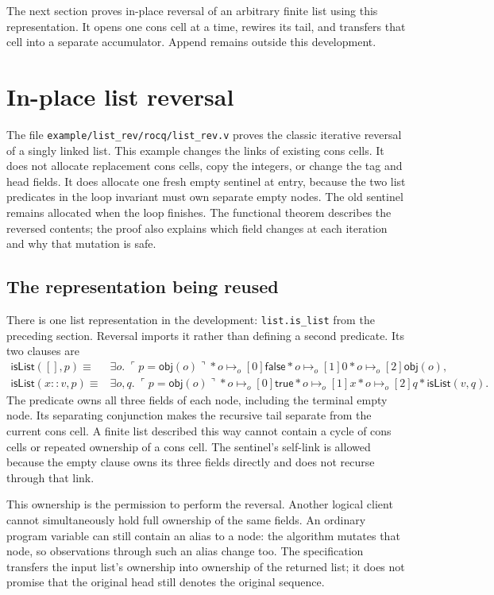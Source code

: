 \documentclass[11pt]{article}
\newcommand{\True}{\mathsf{true}}
\newcommand{\False}{\mathsf{false}}
\newcommand{\ptso}{\mathrel{\mapsto_{o}}}
\newcommand{\sep}{\mathbin{*}}
\newcommand{\pure}[1]{\ulcorner #1 \urcorner}
\begin{document}
The next section proves in-place reversal of an arbitrary finite list using this representation.
It opens one cons cell at a time, rewires its tail, and transfers that cell into a separate accumulator.
Append remains outside this development.

\section{In-place list reversal}
\label{sec:list-reversal}

The file \texttt{example/list\_rev/rocq/list\_rev.v} proves the classic iterative
reversal of a singly linked list. This example changes the links of existing
cons cells. It does not allocate replacement cons cells, copy the integers, or
change the tag and head fields. It does allocate one fresh empty sentinel at
entry, because the two list predicates in the loop invariant must own separate
empty nodes. The old sentinel remains allocated when the loop finishes.
The functional theorem describes the reversed contents; the proof also explains
which field changes at each iteration and why that mutation is safe.

\subsection{The representation being reused}

There is one list representation in the development: \texttt{list.is\_list}
from the preceding section. Reversal imports it rather than defining a second
predicate. Its two clauses are
\[
\begin{aligned}
\mathsf{isList}([],p) \equiv {}&
 \exists o.\;\pure{p=\mathsf{obj}(o)}
 \sep o\ptso[0]\False \sep o\ptso[1]0 \sep o\ptso[2]\mathsf{obj}(o),\\
\mathsf{isList}(x::v,p) \equiv {}&
 \exists o,q.\;\pure{p=\mathsf{obj}(o)}
 \sep o\ptso[0]\True \sep o\ptso[1]x \sep o\ptso[2]q
 \sep\mathsf{isList}(v,q).
\end{aligned}
\]
The predicate owns all three fields of each node, including the terminal empty
node. Its separating conjunction makes the recursive tail separate from the
current cons cell. A finite list described this way cannot contain a cycle of
cons cells or repeated ownership of a cons cell. The sentinel's self-link is
allowed because the empty clause owns its three fields directly and does not
recurse through that link.

This ownership is the permission to perform the reversal. Another logical
client cannot simultaneously hold full ownership of the same fields. An
ordinary program variable can still contain an alias to a node: the algorithm
mutates that node, so observations through such an alias change too. The
specification transfers the input list's ownership into ownership of the
returned list; it does not promise that the original head still denotes the
original sequence.
\end{document}
